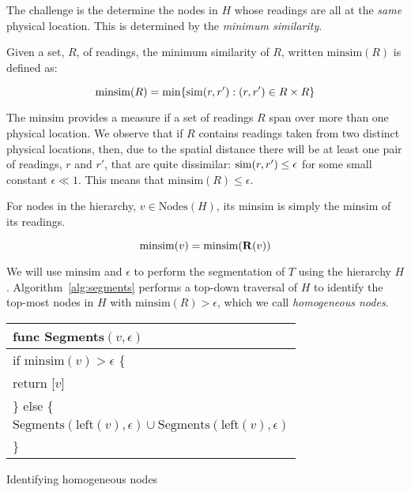 The challenge is the determine the nodes in $H$ whose readings are all at the
{\em same} physical location.  This is determined by the {\em minimum
similarity}.

\begin{definition}
    Given a set, $R$, of readings, the minimum similarity of $R$, written
    $\mathrm{minsim}(R)$ is defined as:

    $$\mathrm{minsim}(R) = \min\{\mathrm{sim}(r,r'): (r,r')\in R\times R\}$$
\end{definition}

The $\mathrm{minsim}$ provides a measure if a set of readings $R$ span over more
than one physical location.
We observe that if $R$ contains readings taken from two distinct physical
locations, then, due to the spatial distance there will be at least one pair of
readings, $r$ and $r'$, that are quite dissimilar: $\mathrm{sim}(r, r') \leq \epsilon$ for some
small constant $\epsilon\ll 1$.  This means that $\mathrm{minsim}(R)\leq \epsilon$.

For nodes in the hierarchy, $v\in\mathrm{Nodes}(H)$, its minsim is simply the
minsim of its readings.

\begin{definition}
    $$\mathrm{minsim}(v) = \mathrm{minsim}(\mathbf{R}(v))$$
\end{definition}

We will use $\mathrm{minsim}$ and $\epsilon$ to perform the segmentation of $T$
using the hierarchy $H$.  Algorithm~\ref{alg:segments} performs a top-down
traversal of $H$ to identify the top-most nodes in $H$ with 
$\mathrm{minsim}(R) > \epsilon$, which we call {\em homogeneous nodes}.

\begin{algorithm}[t]
    \centering
    \begin{tabular}{|l|}\hline
        func Segments$(v, \epsilon)$ \\ \hline
        if $\mathrm{minsim}(v) > \epsilon$ \{ \\
        \RRR return [$v$] \\
        \} else \{ \\
        \RRR $\mathrm{Segments}(\mathrm{left}(v), \epsilon) \cup
                      \mathrm{Segments}(\mathrm{left}(v), \epsilon)$ \\
        \} \\ \hline
    \end{tabular}
    \vspace{0.4cm}
    \caption{Identifying homogeneous nodes}
    \label{alg:segments}
\end{algorithm}

